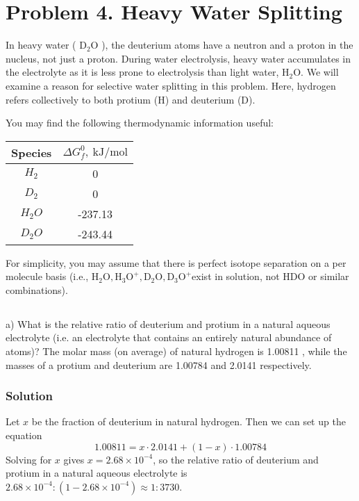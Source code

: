 \documentclass[12pt]{article}
\begin{document}
\section{Problem 4. Heavy Water Splitting}
In heavy water ( $\mathrm{D}_{2} \mathrm{O}$ ), the deuterium atoms have a neutron and a proton in the nucleus, not just a proton. During water electrolysis, heavy water accumulates in the electrolyte as it is less prone to electrolysis than light water, $\mathrm{H}_{2} \mathrm{O}$. We will examine a reason for selective water splitting in this problem. Here, hydrogen refers collectively to both protium (H) and deuterium (D).

You may find the following thermodynamic information useful:

\begin{center}
\begin{tabular}{|c|c|}
\hline
Species & $\Delta G_{f}^{0}, \mathrm{~kJ} / \mathrm{mol}$ \\
\hline
$H_{2}$ & 0 \\
\hline
$D_{2}$ & 0 \\
\hline
$H_{2} O$ & -237.13 \\
\hline
$D_{2} O$ & -243.44 \\
\hline
\end{tabular}
\end{center}

For simplicity, you may assume that there is perfect isotope separation on a per molecule basis (i.e., $\mathrm{H}_{2} \mathrm{O}, \mathrm{H}_{3} \mathrm{O}^{+}, \mathrm{D}_{2} \mathrm{O}, \mathrm{D}_{3} \mathrm{O}^{+}$exist in solution, not HDO or similar combinations).\\
\subsection{}
a) What is the relative ratio of deuterium and protium in a natural aqueous electrolyte (i.e. an electrolyte that contains an entirely natural abundance of atoms)? The molar mass (on average) of natural hydrogen is 1.00811 , while the masses of a protium and deuterium are 1.00784 and 2.0141 respectively.\\
\subsubsection{Solution}
Let $x$ be the fraction of deuterium in natural hydrogen. Then we can set up the equation
\begin{equation}
1.00811 = x \cdot 2.0141 + (1-x) \cdot 1.00784
\end{equation}
Solving for $x$ gives $x = 2.68 \times 10^{-4}$, so the relative ratio of deuterium and protium in a natural aqueous electrolyte is $2.68 \times 10^{-4}: (1-2.68 \times 10^{-4}) \approx 1:3730$.
\end{document}
